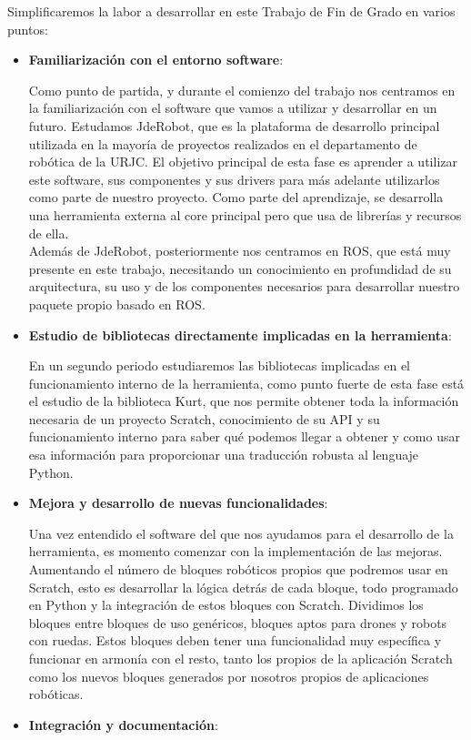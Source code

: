 Simplificaremos la labor a desarrollar en este Trabajo de Fin de Grado en varios puntos:
\begin{itemize}
\item \textbf{Familiarización con el entorno software}: 

Como punto de partida, y durante el comienzo del trabajo nos centramos en la familiarización con el software que vamos a utilizar y desarrollar en un futuro. Estudamos JdeRobot, que es la plataforma de desarrollo principal utilizada en la mayoría de proyectos realizados en el departamento de robótica de la URJC. El objetivo principal de esta fase es aprender a utilizar este software, sus componentes y sus drivers para más adelante utilizarlos como parte de nuestro proyecto. Como parte del aprendizaje, se desarrolla una herramienta externa al core principal pero que usa de librerías y recursos de ella.\\

Además de JdeRobot, posteriormente nos centramos en ROS, que está muy presente en este trabajo, necesitando un conocimiento en profundidad de su arquitectura, su uso y de los componentes necesarios para desarrollar nuestro paquete propio basado en ROS.
\item \textbf{Estudio de bibliotecas directamente implicadas en la herramienta}: 

En un segundo periodo estudiaremos las bibliotecas implicadas en el funcionamiento interno de la herramienta, como punto fuerte de esta fase está el estudio de la biblioteca Kurt, que nos permite obtener toda la información necesaria de un proyecto Scratch, conocimiento de su API y su funcionamiento interno para saber qué podemos llegar a obtener y como usar esa información para proporcionar una traducción robusta al lenguaje Python.
\item \textbf{Mejora y desarrollo de nuevas funcionalidades}: 

Una vez entendido el software del que nos ayudamos para el desarrollo de la herramienta, es momento comenzar con la implementación de las mejoras. Aumentando el número de bloques robóticos propios que podremos usar en Scratch, esto es desarrollar la lógica detrás de cada bloque, todo programado en Python y la integración de estos bloques con Scratch. Dividimos los bloques entre bloques de uso genéricos, bloques aptos para drones y robots con ruedas. Estos bloques deben tener una funcionalidad muy específica y funcionar en armonía con el resto, tanto los propios de la aplicación Scratch como los nuevos bloques generados por nosotros propios de aplicaciones robóticas.
\item \textbf{Integración y documentación}: 


\end{itemize}
